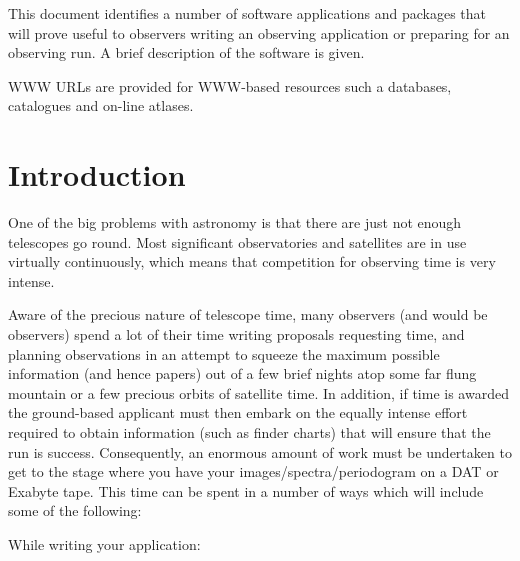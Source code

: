 \documentclass[twoside,11pt]{article}
\newcommand{\stardocinitials}  {SG}
\newcommand{\stardocnumber}    {10.2}
\newcommand{\stardocabstract}  {This document identifies a number of software 
applications and packages that will prove useful to observers writing an
observing application or preparing for an observing run.
A brief description of the software is given. 

WWW URLs are provided for WWW-based resources such a databases, catalogues and on-line atlases. 
}
\newcommand{\stardocname}{\stardocinitials /\stardocnumber}
\newenvironment{latexonly}{}{}
\newcommand{\xlabel}[1]{}
\newcommand{\latexonlytoc}[0]{\tableofcontents}
\renewcommand{\thepage}{\roman{page}}
\begin{document}
\stardocabstract
 \newpage
 \begin{latexonly}
   \setlength{\parskip}{0mm}
   \latexonlytoc
   \setlength{\parskip}{\medskipamount}
   \markboth{\stardocname}{\stardocname}
 \end{latexonly}
\cleardoublepage
\renewcommand{\thepage}{\arabic{page}}

\setcounter{page}{1}
 
\section{Introduction} \xlabel{INTRODUCTION}
\label{sec:introduction}

One of the big problems with astronomy is that there are just not enough
telescopes go round. Most significant observatories and satellites are in use
virtually continuously, which means that competition
for observing time is very intense. 

Aware of the precious nature of telescope time, many observers (and would be
observers) spend a lot of their time writing proposals requesting time, and
planning observations in an attempt to squeeze the maximum possible
information (and hence papers) out of a few brief nights atop some far flung
mountain or a few precious orbits of satellite time. In addition, if  
time is awarded the ground-based applicant must then embark on the equally 
intense effort required to obtain information (such as finder charts) that will
ensure that the run is success. Consequently, an enormous amount of work
must be undertaken to get to the stage where you have your 
images/spectra/periodogram on a DAT or Exabyte tape. This time can be spent in a number of
ways which will include some of the following:

While writing your application:
\end{document}
